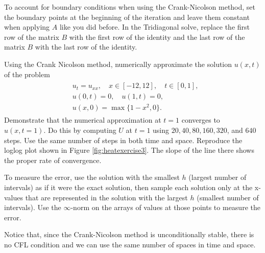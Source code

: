 To account for boundary conditions when using the Crank-Nicolson method, set the boundary points at the beginning of the iteration and leave them constant when applying $A$ like you did before.
In the Tridiagonal solve, replace the first row of the matrix $B$ with the first row of the identity and the last row of the matrix $B$ with the last row of the identity.

\begin{problem}
\label{prob:heat_exercise3}
Using the Crank Nicolson method, numerically approximate the solution $u(x,t)$ of the problem
\begin{align}
	\begin{split}
	&{ } u_t = u_{xx}, \quad x \in [-12,12],\quad t \in [0,1],\\
	&{ } u(0,t) = 0,\quad u(1,t) = 0,\\
	&{ } u(x,0) = \max\{1 - x^2,0\}.
	\end{split}
\end{align}
Demonstrate that the numerical approximation at $t = 1$ converges to  $u(x,t=1)$.
Do this by computing $U$ at $t=1$ using $20,40,80,160,320$, and $640$ steps.
Use the same number of steps in both time and space.
Reproduce the loglog plot shown in Figure \ref{fig:heatexercise3}.
The slope of the line there shows the proper rate of convergence.

To measure the error, use the solution with the smallest $h$ (largest number of intervals) as if it were the exact solution, then sample each solution only at the x-values that are represented in the solution with the largest $h$ (smallest number of intervals).
Use the $\infty$-norm on the arrays of values at those points to measure the error.

Notice that, since the Crank-Nicolson method is unconditionally stable, there is no CFL condition and we can use the same number of spaces in time and space.
\end{problem}

